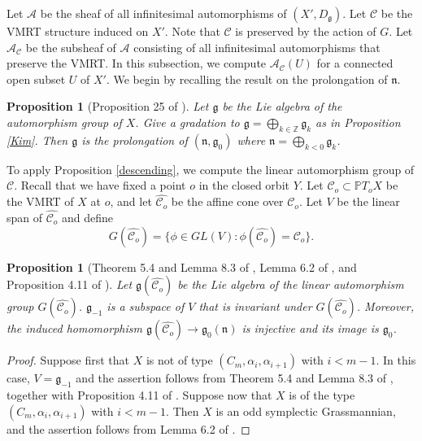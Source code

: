 \documentclass{amsart}
\newtheorem{proposition}[theorem]{Proposition}
\theoremstyle{definition}
\theoremstyle{remark}
\newcommand{\Z}{\mathbb{Z}}
\newcommand{\g}{\mathfrak{g}}
\newcommand{\n}{\mathfrak{n}}
\begin{document}
Let $\mathcal{A}$ be the sheaf of all infinitesimal automorphisms of $(X', D_\g)$. Let $\mathscr{C}$ be the VMRT structure induced on $X'$. Note that $\mathscr{C}$ is preserved by the action of $G$. Let $\mathcal{A}_\mathscr{C}$ be the subsheaf of $\mathcal{A}$ consisting of all infinitesimal automorphisms that preserve the VMRT. In this subsection, we compute $\mathcal{A}_{\mathscr{C}}(U)$ for a connected open subset $U$ of $X'$. We begin by recalling the result on the prolongation of $\n$.


\begin{proposition}[Proposition 25 of \cite{K}]
\label{prolongation}
Let $\g$ be the Lie algebra of the automorphism group of $X$. Give a gradation to $\g = \bigoplus_{k \in \Z} \g_k$ as in Proposition \ref{Kim}. Then $\g$ is the prolongation of $(\n, \g_0)$ where $\n = \bigoplus_{k < 0} \g_k$.    
\end{proposition}

To apply Proposition \ref{descending}, we compute the linear automorphism group of $\mathscr{C}$.
Recall that we have fixed a point $o$ in the closed orbit $Y$. Let $\mathscr{C}_o \subset \mathbb{P}T_oX$ be the VMRT of $X$ at $o$, and let $\widehat{\mathscr{C}_o}$ be the affine cone over $\mathscr{C}_o$. Let $V$ be the linear span of $\widehat{\mathscr{C}_o}$ and define  
\[G(\widehat{\mathscr{C}_o}) = \{\phi \in GL(V) : \phi(\widehat{\mathscr{C}_o}) = \widehat{\mathscr{C}_o}\}.\]

\begin{proposition}[Theorem 5.4 and Lemma 8.3 of \cite{HK}, Lemma 6.2 of \cite{HL1}, and Proposition 4.11 of \cite{HL2}]
\label{g_0}
Let $\mathfrak{g}(\widehat{\mathscr{C}_o})$ be the Lie algebra of the linear automorphism group $G(\widehat{\mathscr{C}_o})$. $\g_{-1}$ is a subspace of $V$ that is invariant under $G(\widehat{\mathscr{C}_o})$. Moreover, the induced homomorphism $\mathfrak{g}(\widehat{\mathscr{C}_o}) \to \mathfrak{g}_0(\n)$ is injective and its image is $\mathfrak{g}_0$.
\end{proposition}

\begin{proof}
Suppose first that $X$ is not of type $(C_m, \alpha_i, \alpha_{i+1})$ with $i < m -1$. In this case, $V = \g_{-1}$ and the assertion follows from Theorem 5.4 and Lemma 8.3 of \cite{HK}, together with Proposition 4.11 of \cite{HL2}. Suppose now that $X$ is of the type $(C_m, \alpha_i, \alpha_{i+1})$ with $i < m -1$. Then $X$ is an odd symplectic Grassmannian, and the assertion follows from Lemma 6.2 of \cite{HL1}.
\end{proof}
\end{document}
